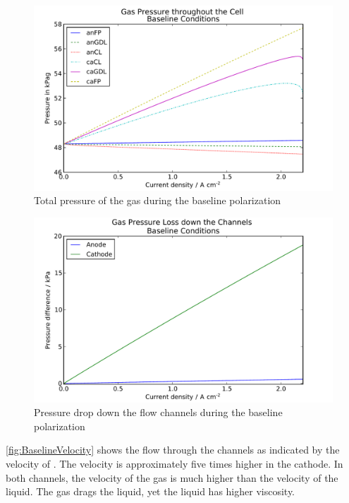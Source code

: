 \begin{figure}[htbp]
  \includegraphics[width=\linewidth]{Results/Cell/Model/1/PressureGas}%
  \caption{Total pressure of the gas during the baseline polarization}%
  \label{fig:PressureGas}
\end{figure}

\begin{figure}[htbp]
  \includegraphics[width=\linewidth]{Results/Cell/Model/1/ChannelPressureDrop}%
  \caption{Pressure drop down the flow channels during the baseline polarization}%
  \label{fig:ChannelPressureDrop}
\end{figure}

\autoref{fig:BaselineVelocity} shows the flow through the channels as indicated by the velocity of .  The velocity is approximately five times higher in the cathode.  In both channels, the velocity of the gas is much higher than the velocity of the liquid.  The gas drags the liquid, yet the liquid has higher viscosity.

